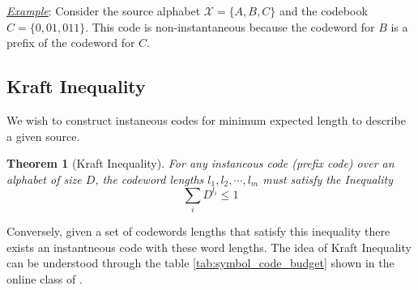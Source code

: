 \documentclass[a4paper,10pt]{article}
\newtheorem{theorem}{Theorem}
\begin{document}
\noindent \underline{\textit{Example}}: Consider the source alphabet $\mathcal{X} = \{A, B, C\}$ and the codebook $C = \{0, 01, 011\}$. This code is non-instantaneous because the codeword for \( B \) is a prefix of the codeword for \( C \).

\subsection{Kraft Inequality}

We wish to construct instaneous codes for minimum expected length to describe a given source. 

\begin{theorem}[Kraft Inequality]
    For any instaneous code (prefix code) over an alphabet of size $D$, the codeword lengths $l_1, l_2, \cdots, l_m$ must satisfy the Inequality
    \begin{equation}
        \sum_{i} D^{l_i} \leq 1
    \end{equation}
\end{theorem}

Conversely, given a set of codewords lengths that satisfy this inequality there exists an instantneous code with these word lengths. The idea of Kraft Inequality can be understood through the table \ref{tab:symbol_code_budget} shown in the online class of \cite{mackay_youtube_playlist}.


\newpage
\fontsize{8}{9}\selectfont


\clearpage
\end{document}
